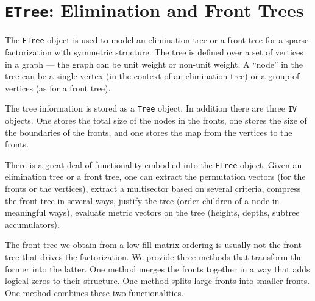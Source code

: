 \chapter{{\tt ETree}: Elimination and Front Trees}
\label{chapter:ETree}
\par
The {\tt ETree} object is used to model an elimination tree or a
front tree for a sparse factorization with symmetric structure.
The tree is defined over a set of vertices in a graph --- the graph
can be unit weight or non-unit weight.
A ``node'' in the tree can be a single vertex (in the context of 
an elimination tree) or a group of vertices (as for a front tree).
\par
The tree information is stored as a {\tt Tree} object.
In addition there are three {\tt IV} objects.
One stores the total size of the nodes in the fronts,
one stores the size of the boundaries of the fronts,
and one stores the map from the vertices to the fronts.
\par
There is a great deal of functionality embodied into the {\tt ETree} 
object.
Given an elimination tree or a front tree, one can extract the
permutation vectors (for the fronts or the vertices), extract a
multisector based on several criteria, compress the front tree in
several ways, justify the tree (order children of a node in
meaningful ways), evaluate metric vectors on the tree (heights,
depths, subtree accumulators).
\par
The front tree we obtain from a low-fill matrix ordering is usually
not the front tree that drives the factorization.
We provide three methods that transform the former into the latter.
One method merges the fronts together in a
way that adds logical zeros to their structure.
One method splits large fronts into smaller fronts.
One method combines these two functionalities.

